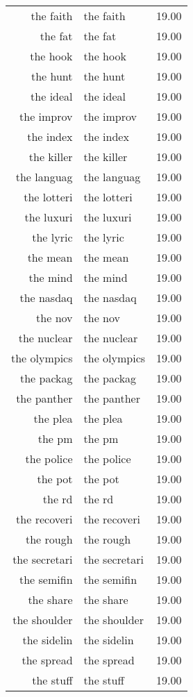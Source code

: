 \begin{table}[ht]
\begin{tabular}{rlr}
  the faith & the faith & 19.00 \\ 
  the fat & the fat & 19.00 \\ 
  the hook & the hook & 19.00 \\ 
  the hunt & the hunt & 19.00 \\ 
  the ideal & the ideal & 19.00 \\ 
  the improv & the improv & 19.00 \\ 
  the index & the index & 19.00 \\ 
  the killer & the killer & 19.00 \\ 
  the languag & the languag & 19.00 \\ 
  the lotteri & the lotteri & 19.00 \\ 
  the luxuri & the luxuri & 19.00 \\ 
  the lyric & the lyric & 19.00 \\ 
  the mean & the mean & 19.00 \\ 
  the mind & the mind & 19.00 \\ 
  the nasdaq & the nasdaq & 19.00 \\ 
  the nov & the nov & 19.00 \\ 
  the nuclear & the nuclear & 19.00 \\ 
  the olympics & the olympics & 19.00 \\ 
  the packag & the packag & 19.00 \\ 
  the panther & the panther & 19.00 \\ 
  the plea & the plea & 19.00 \\ 
  the pm & the pm & 19.00 \\ 
  the police & the police & 19.00 \\ 
  the pot & the pot & 19.00 \\ 
  the rd & the rd & 19.00 \\ 
  the recoveri & the recoveri & 19.00 \\ 
  the rough & the rough & 19.00 \\ 
  the secretari & the secretari & 19.00 \\ 
  the semifin & the semifin & 19.00 \\ 
  the share & the share & 19.00 \\ 
  the shoulder & the shoulder & 19.00 \\ 
  the sidelin & the sidelin & 19.00 \\ 
  the spread & the spread & 19.00 \\ 
  the stuff & the stuff & 19.00 \\ 

\end{tabular}
\end{table}
